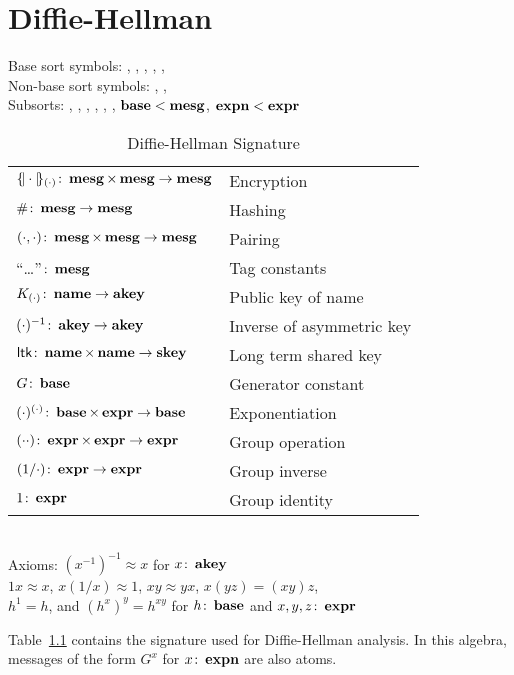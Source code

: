 \documentclass[12pt]{report}
\theoremstyle{definition}
\newcommand{\gen}{\ensuremath{G}}
\begin{document}
\chapter{Diffie-Hellman}

\begin{table}
\begin{center}
Base sort symbols: , , , ,
, \\
Non-base sort symbols: , ,  \\[1ex]
Subsorts: , , , , ,
, $\operatorname{\mathbf{base}}<\operatorname{\mathbf{mesg}}$,
$\operatorname{\mathbf{expn}}<\operatorname{\mathbf{expr}}$\\[1ex]
\begin{tabular}{@{}ll}
$\{\!|\cdot|\!\}_{(\cdot)}\colon\operatorname{\mathbf{mesg}}\times\operatorname{\mathbf{mesg}}\rightarrow\operatorname{\mathbf{mesg}}$
&Encryption\\
$\#\colon\operatorname{\mathbf{mesg}}\rightarrow\operatorname{\mathbf{mesg}}$
&Hashing\\
$(\cdot,\cdot)\colon\operatorname{\mathbf{mesg}}\times\operatorname{\mathbf{mesg}}\rightarrow\operatorname{\mathbf{mesg}}$
&Pairing\\
``\ldots''$\colon\operatorname{\mathbf{mesg}}$& Tag constants\\
$K_{(\cdot)}\colon\operatorname{\mathbf{name}}\rightarrow\operatorname{\mathbf{akey}}$
&Public key of name\\
$(\cdot)^{-1}\colon\operatorname{\mathbf{akey}}\rightarrow\operatorname{\mathbf{akey}}$
&Inverse of asymmetric key\\
$\operatorname{\mathsf{ltk}}\colon\operatorname{\mathbf{name}}\times\operatorname{\mathbf{name}}\rightarrow\operatorname{\mathbf{skey}}$
& Long term shared key\\
$\gen\colon\dom{base}$
& Generator constant\\
$(\cdot)^{(\cdot)}\colon\operatorname{\mathbf{base}}\times\operatorname{\mathbf{expr}}\rightarrow\operatorname{\mathbf{base}}$
& Exponentiation\\
$(\cdot\cdot)\colon\operatorname{\mathbf{expr}}\times\operatorname{\mathbf{expr}}\rightarrow\operatorname{\mathbf{expr}}$
& Group operation\\
$(1/\cdot)\colon\operatorname{\mathbf{expr}}\rightarrow\operatorname{\mathbf{expr}}$
& Group inverse\\
$1\colon\operatorname{\mathbf{expr}}$
& Group identity
\end{tabular}\\[1ex]
Axioms: $(x^{-1})^{-1}\approx x$ for $x\colon\operatorname{\mathbf{akey}}$\\
$1x\approx x$, $x(1/x)\approx 1$, $xy\approx yx$, $x(yz)=(xy)z$,\\
$h^1=h$, and $(h^x)^y=h^{xy}$ for $h\colon\operatorname{\mathbf{base}}$ and
$x,y,z\colon\operatorname{\mathbf{expr}}$
\\[1ex]
\caption{Diffie-Hellman Signature}\label{tab:dh}
\end{center}
\end{table}

Table~\ref{tab:dh} contains the signature used for Diffie-Hellman
analysis.  In this algebra, messages of the form $\gen^x$ for
$x\colon\operatorname{\mathbf{expn}}$ are also atoms.




\printindex
\end{document}
